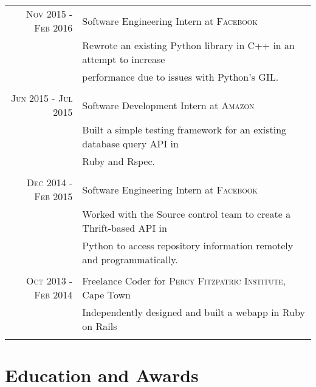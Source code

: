 \documentclass[a4paper,10pt]{article} %
\begin{document}
\begin{tabular}{r|p{11cm}}
\textsc{Nov 2015 - Feb 2016} & Software Engineering Intern at \textsc{Facebook} \emph{}\\
& \footnotesize{Rewrote an existing Python library in C++ in an attempt to increase}\\
& \footnotesize{performance due to issues with Python's GIL.}\\
\multicolumn{2}{c}{} \\

\textsc{Jun 2015 - Jul 2015} & Software Development Intern at \textsc{Amazon} \emph{}\\
& \footnotesize{Built a simple testing framework for an existing database query API in}\\
& \footnotesize{Ruby and Rspec.}\\
\multicolumn{2}{c}{} \\

\textsc{Dec 2014 - Feb 2015} & Software Engineering Intern at \textsc{Facebook} \emph{}\\
& \footnotesize{Worked with the Source control team to create a Thrift-based API in}\\
& \footnotesize{Python to access repository information remotely and programmatically.}\\
\multicolumn{2}{c}{} \\




\textsc{Oct 2013 - Feb 2014} & Freelance Coder for \textsc{Percy Fitzpatric Institute}, Cape Town \emph{}\\
& \footnotesize{Independently designed and built a webapp in Ruby on Rails}\\
\multicolumn{2}{c}{} \\


\end{tabular}


\section{Education and Awards}
\end{document}
